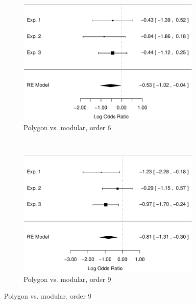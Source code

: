 \documentclass[man,10pt]{apa6}
\begin{document}
\begin{figure}
\centering
\begin{subfigure}[c]{0.4\textwidth}
\centering
\includegraphics[width=\textwidth]{figures/meta/question_typeinverse_nonzero_6_conditionpolygon.pdf}
\caption{Polygon vs. modular, order 6}
\end{subfigure}
~
\begin{subfigure}[c]{0.4\textwidth}
\centering
\includegraphics[width=\textwidth]{figures/meta/question_typeinverse_nonzero_9_conditionpolygon.pdf}
\caption{Polygon vs. modular, order 9}


\end{subfigure}
\end{figure}
\end{document}
